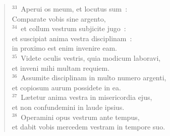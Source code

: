 \begin{flushleft}
\begin{verse}
${}^{33}$~Aperui os meum, et locutus sum~:\\ Comparate vobis sine argento,\\
${}^{34}$~et collum vestrum subjicite jugo~:\\ et suscipiat anima vestra disciplinam~:\\ in proximo est enim invenire eam.\\
${}^{35}$~Videte oculis vestris, quia modicum laboravi,\\ et inveni mihi multam requiem.\\
${}^{36}$~Assumite disciplinam in multo numero argenti,\\ et copiosum aurum possidete in ea.\\
${}^{37}$~L\ae tetur anima vestra in misericordia ejus,\\ et non confundemini in laude ipsius.\\
${}^{38}$~Operamini opus vestrum ante tempus,\\ et dabit vobis mercedem vestram in tempore suo.\end{verse}\end{flushleft}


